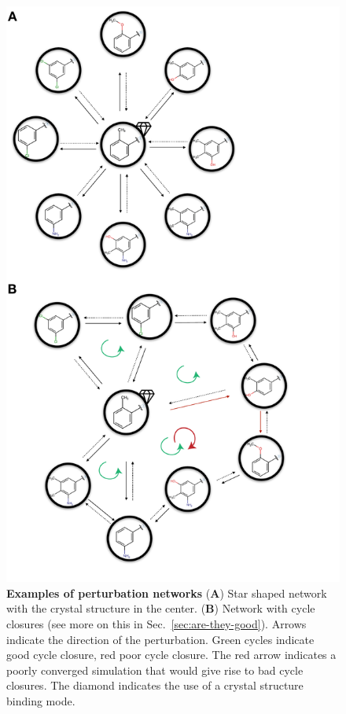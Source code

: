 \documentclass[9pt,bestpractices]{livecoms}
\begin{document}
\begin{figure}[h!]
    \includegraphics[width=0.95\columnwidth]{figures/fig6_types_of_networks/Figure.pdf}
    \caption{\textbf{Examples of perturbation networks} (\textbf{A}) Star shaped network with the crystal structure in the center. (\textbf{B}) Network with cycle closures (see more on this in Sec.~\ref{sec:are-they-good}). Arrows indicate the direction of the perturbation. Green cycles indicate good cycle closure, red poor cycle closure. The red arrow indicates a poorly converged simulation that would give rise to bad cycle closures. The diamond indicates the use of a crystal structure binding mode.}
    \label{fig:fig_types_of_networks}
\end{figure} 
\end{document}
